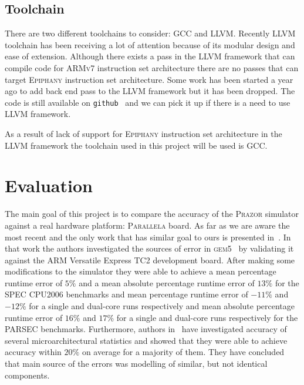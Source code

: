 \documentclass{hitec}
\begin{document}
\subsection{Toolchain}
\label{ref:toolchain}
There are two different toolchains to consider: \textsc{GCC} and
\textsc{LLVM}. Recently \textsc{LLVM} toolchain has been receiving a lot of
attention because of its modular design and ease of extension. Although there exists a pass
in the \textsc{LLVM} framework that can compile code for \textsc{ARMv7}
instruction set architecture there are no passes that can target
\textsc{Epiphany} instruction set architecture. Some work has been started a
year ago to add back end pass to the \textsc{LLVM} framework but it has been
dropped. The code is still available on \texttt{github}~\cite{llvmepiphany} and we can pick it up if
there is a need to use \textsc{LLVM} framework. 

As a result of lack of support
for \textsc{Epiphany} instruction set architecture in the \textsc{LLVM}
framework the toolchain used in this project will be used is \textsc{GCC}. 

\label{sec:implementation}
\section{Evaluation}
\label{sec:evaluation}
The main goal of this project is to compare the accuracy of the
\textsc{Prazor} simulator against a real hardware platform: \textsc{Parallela}
board. As far as we are aware the most recent and the only work that has similar
goal to ours is presented in~\cite{eval}. In that work the authors investigated the
sources of error in \textsc{gem5}~\cite{gem5} by validating it against the \textsc{ARM}
Versatile Express TC2 development board. After making some modifications to
the simulator they were able to achieve a mean percentage runtime error of
$5\%$ and a mean absolute percentage runtime error of $13\%$ for the \textsc{SPEC}
CPU2006 benchmarks and mean percentage runtime error of $-11\%$ and $-12\%$
for a single and dual-core runs respectively and mean absolute percentage
runtime error of $16\%$ and $17\%$ for a single and dual-core runs
respectively for the \textsc{PARSEC} benchmarks. Furthermore, authors
in~\cite{eval} have investigated accuracy of several microarchitectural
statistics and showed that they were able to achieve accuracy within $20\%$
on average for a majority of them. They have concluded that main source of the
errors was modelling of similar, but not identical components. 
\end{document}
